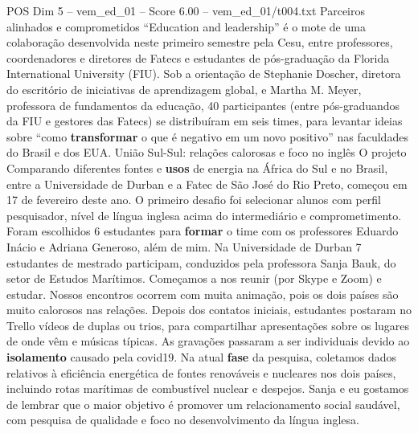 \begin{textsample}{POS Dim 5 – vem\_ed\_01 – Score 6.00 – vem\_ed\_01/t004.txt}  \label{ex:f5_pos_117}
Parceiros alinhados e comprometidos “Education and leadership” é o mote de uma colaboração desenvolvida neste primeiro semestre pela Cesu, entre professores, coordenadores e diretores de Fatecs e estudantes de pós-graduação da Florida International University (FIU).
Sob a orientação de Stephanie Doscher, diretora do escritório de iniciativas de aprendizagem global, e Martha M.
Meyer, professora de fundamentos da educação, 40 participantes (entre pós-graduandos da FIU e gestores das Fatecs) se distribuíram em seis times, para levantar ideias sobre “como \textbf{transformar} o que é negativo em um novo positivo” nas faculdades do Brasil e dos EUA.
União Sul-Sul: relações calorosas e foco no inglês O projeto Comparando diferentes fontes e \textbf{usos} de energia na África do Sul e no Brasil, entre a Universidade de Durban e a Fatec de São José do Rio Preto, começou em 17 de fevereiro deste ano.
O primeiro desafio foi selecionar alunos com perfil pesquisador, nível de língua inglesa acima do intermediário e comprometimento.
Foram escolhidos 6 estudantes para \textbf{formar} o time com os professores Eduardo Inácio e Adriana Generoso, além de mim.
Na Universidade de Durban 7 estudantes de mestrado participam, conduzidos pela professora Sanja Bauk, do setor de Estudos Marítimos.
Começamos a nos reunir (por Skype e Zoom) e estudar.
Nossos encontros ocorrem com muita animação, pois os dois países são muito calorosos nas relações.
Depois dos contatos iniciais, estudantes postaram no Trello vídeos de duplas ou trios, para compartilhar apresentações sobre os lugares de onde vêm e músicas típicas.
As gravações passaram a ser individuais devido ao \textbf{isolamento} causado pela covid19.
Na atual \textbf{fase} da pesquisa, coletamos dados relativos à eficiência energética de fontes renováveis e nucleares nos dois países, incluindo rotas marítimas de combustível nuclear e despejos.
Sanja e eu gostamos de lembrar que o maior objetivo é promover um relacionamento social saudável, com pesquisa de qualidade e foco no desenvolvimento da língua inglesa.

\end{textsample}
